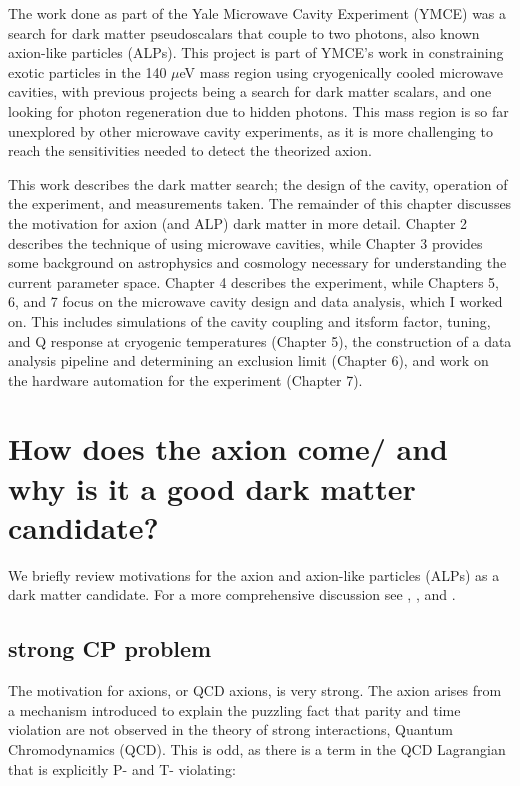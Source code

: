 \documentclass[12pt,twosides]{book}
\begin{document}
The work done as part of the Yale Microwave Cavity Experiment (YMCE) was a search for dark matter pseudoscalars that couple to two photons, also known axion-like particles (ALPs). This project is part of YMCE's work in constraining exotic particles in the 140 $\mu$eV mass region using cryogenically cooled microwave cavities, with previous projects being a search for dark matter scalars, and one looking for photon regeneration due to hidden photons. This mass region is so far unexplored by other microwave cavity experiments, as it is more challenging to reach the sensitivities needed to detect the theorized axion.

This work describes the dark matter search; the design of the cavity, operation of the experiment, and measurements taken. The remainder of this chapter discusses the motivation for axion (and ALP) dark matter in more detail. Chapter 2 describes the technique of using microwave cavities, while Chapter 3 provides some background on astrophysics and cosmology necessary for understanding the current parameter space. Chapter 4 describes the experiment, while Chapters 5, 6, and 7 focus on the microwave cavity design and data analysis, which I worked on. This includes simulations of the cavity coupling and itsform factor, tuning, and Q response at cryogenic temperatures (Chapter 5), the construction of a data analysis pipeline and determining an exclusion limit (Chapter 6), and work on the hardware automation for the experiment (Chapter 7).

\section{How does the axion come/ and why is it a good dark matter candidate?}

We briefly review motivations for the axion and axion-like particles (ALPs) as a dark matter candidate. For a more comprehensive discussion see \cite{hewett12}, \cite{arias12}, and \cite{kim87}. 

\subsection{strong CP problem}

The motivation for axions, or QCD axions, is very strong. The axion arises from a mechanism introduced to explain the puzzling fact that parity and time violation are not observed in the theory of strong interactions, Quantum Chromodynamics (QCD). This is odd, as there is a term in the QCD Lagrangian that is explicitly P- and T- violating:
\end{document}
